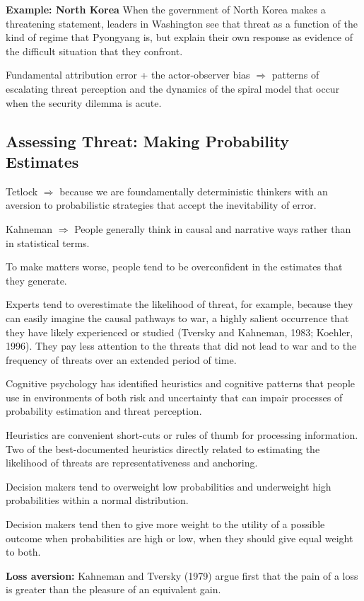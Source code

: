\textbf{Example: North Korea} When the government of North Korea makes a threatening statement, leaders in Washington see that threat as a function of the kind of regime that Pyongyang is, but explain their own response as evidence of the difficult situation that they confront.

Fundamental attribution error + the actor-observer bias $\Rightarrow$ patterns of escalating threat perception and the dynamics of the spiral model that occur when the security dilemma is acute.

\subsection{Assessing Threat: Making Probability Estimates}
Tetlock $\Rightarrow$ because we are foundamentally  deterministic thinkers with an aversion to probabilistic strategies that accept the inevitability of error.

Kahneman $\Rightarrow$ People generally think in causal and narrative ways rather than in statistical terms.

To make matters worse, people tend to be overconfident in the estimates that they generate.

Experts tend to overestimate the likelihood of threat, for example, because they can easily imagine the causal pathways to war, a highly salient occurrence that they have likely experienced or studied (Tversky and Kahneman, 1983; Koehler, 1996). They pay less attention to the threats that did not lead to war and to the frequency of threats over an extended period of time.

Cognitive psychology has identified heuristics and cognitive patterns that people use in environments of both risk and uncertainty that can impair processes of probability estimation and threat perception.

Heuristics are convenient short-cuts or rules of thumb for processing information. Two of the best-documented heuristics directly related to estimating the likelihood of threats are representativeness and anchoring.

Decision makers tend to overweight low probabilities and underweight high probabilities within a normal distribution.

Decision makers tend then to give more weight to the utility of a possible outcome when probabilities are high or low, when they should give equal weight to both.

\textbf{Loss aversion:} Kahneman and Tversky (1979) argue first that the pain of a loss is greater than the pleasure of an equivalent gain.

